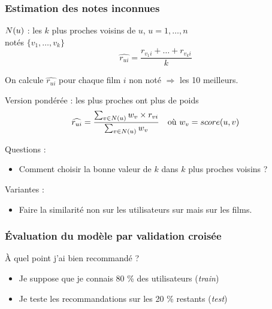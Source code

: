 \documentclass[handout]{beamer}
\begin{document}
\begin{frame}
	\frametitle{Estimation des notes inconnues}
	$N(u)$ : les $k$ plus proches voisins de $u$, \qquad $u = 1, \ldots, n$\\
	notés $\{v_1, \ldots, v_k\}$\bigskip
	\pause
	\[ \widehat{r_{ui}} = \frac{r_{v_1 i} + \ldots + r_{v_k i}}k \] %
	\pause
	
	On calcule $\widehat{r_{ui}}$ pour chaque film $i$ non noté $\Rightarrow$ les \alert{10 meilleurs}.\bigskip
	
	\pause
	Version \alert{pondérée} : les plus proches ont plus de poids
	\[ \widehat{r_{ui}} = \frac{\sum_{v \in N(u)} w_v \times r_{vi}}{\sum_{v \in N(u)} w_v} \quad \textnormal{où } w_v = score(u, v) \]
\end{frame}

\begin{frame}
	Questions :
	\begin{itemize}
	\item Comment choisir la bonne valeur de $k$ dans \og $k$ plus proches voisins \fg ?
	\end{itemize}
	\pause
	Variantes :
	\begin{itemize}
	\item Faire la similarité non sur les utilisateurs sur mais sur les films.
	\end{itemize}
\end{frame}

\begin{frame}
	\frametitle{Évaluation du modèle par validation croisée}
	À quel point j'ai bien recommandé ?
	\begin{itemize}[<+->]
	\item Je suppose que je connais 80 \% des utilisateurs (\alert{\emph{train}})
	\item Je teste les recommandations sur les 20 \% restants (\alert{\emph{test}})
	\end{itemize}\bigskip
\end{frame}
\end{document}
